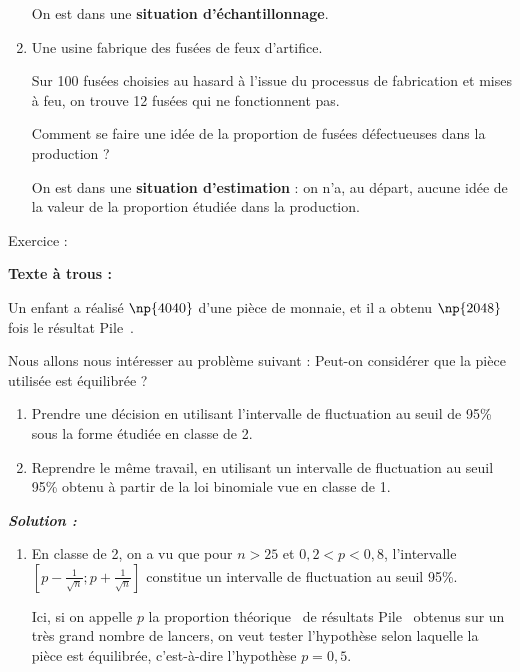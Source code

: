 \documentclass[12pt,french]{article}
\begin{document}
\begin{spacing}{1.2}
\begin{enumerate}
On est dans une \textbf{situation d'échantillonnage}.

\item Une usine fabrique des fusées de feux d'artifice.

Sur 100 fusées choisies au hasard à l'issue du processus de fabrication et mises à feu, on trouve 12 fusées qui ne fonctionnent pas.

Comment se faire une idée de la proportion de fusées défectueuses dans la production ?

On est dans une \textbf{situation d'estimation} : on n'a, au départ, aucune idée de la valeur de la proportion étudiée dans la production.
\end{enumerate}

\medskip


\begin{bclogo}[couleur = blue!30 , arrondi = 0.1 ,logo = \bclampe , barre = snake , tailleOndu = 1.5]{Exercice :}


\textbf{Texte à trous :}

Un enfant a réalisé $\np{4040}$  d'une pièce de monnaie, et il a obtenu $\np{2048}$ fois le résultat \og Pile\fg~.

Nous allons nous intéresser au problème suivant : \og Peut-on considérer que la pièce utilisée est équilibrée ?\fg~

\begin{enumerate}
\item Prendre une décision en utilisant l'intervalle de fluctuation au seuil de 95\% sous la forme étudiée en classe de 2.
\item Reprendre le même travail, en utilisant un intervalle de fluctuation au seuil 95\% obtenu à partir de la loi binomiale vue en classe de 1.
\end{enumerate}
\end{bclogo}


\newpage

\textbf{\textit{Solution :}}

\begin{enumerate}
\item En classe de 2, on a vu que pour $n>25$ et $0,2<p<0,8$, l'intervalle $\left[p-\frac{1}{\sqrt{n}};p+\frac{1}{\sqrt{n}}\right]$ constitue un intervalle de fluctuation au seuil 95\%.

Ici, si on appelle $p$ la \og proportion théorique\fg~ de résultats \og Pile\fg~ obtenus sur un très grand nombre de lancers, on veut tester l'hypothèse selon laquelle la pièce est équilibrée, c'est-à-dire l'hypothèse $p=0,5$.


\end{enumerate}
\end{spacing}
\end{document}

